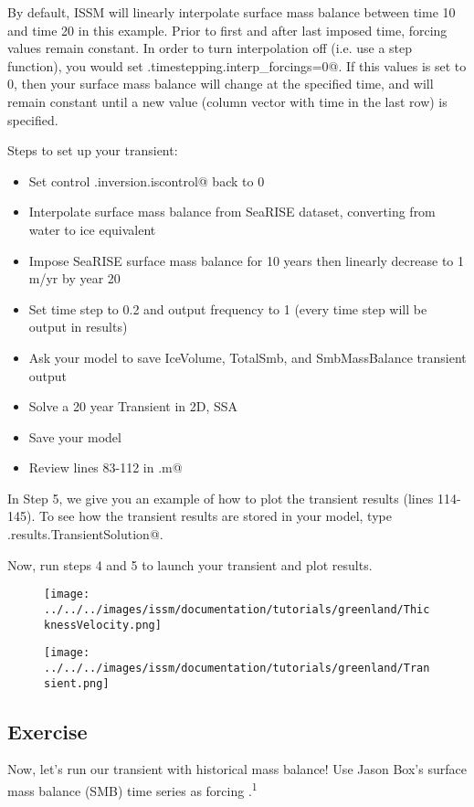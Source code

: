 By default, ISSM will linearly interpolate surface mass balance between time 10 and time 20 in this example. Prior to first and after last imposed time, forcing values remain constant. In order to turn interpolation off (i.e. use a step function), you would set \verb@md.timestepping.interp_forcings=0@. If this values is set to 0, then your surface mass balance will change at the specified time, and will remain constant until a new value (column vector with time in the last row) is specified.

Steps to set up your transient:
\begin{itemize}
	\item Set control \verb@md.inversion.iscontrol@ back to 0
	\item Interpolate surface mass balance from SeaRISE dataset, converting from water to ice equivalent
	\item Impose SeaRISE surface mass balance for 10 years then linearly decrease to 1 m/yr by year 20
	\item Set time step to 0.2 and output frequency to 1 (every time step will be output in results)
	\item Ask your model to save IceVolume, TotalSmb, and SmbMassBalance transient output
	\item Solve a 20 year Transient in 2D, SSA
	\item Save your model
	\item Review lines 83-112 in \verb@runme.m@
\end{itemize}

In Step 5, we give you an example of how to plot the transient results (lines 114-145). To see how the transient results are stored in your model, type \verb@md.results.TransientSolution@.

Now, run steps 4 and 5 to launch your transient and plot results.
\begin{figure}[H]
	\begin{center}
		\texttt{[image: ../../../images/issm/documentation/tutorials/greenland/ThicknessVelocity.png]}
	\end{center}
\end{figure}

\begin{figure}[H]
	\begin{center}
		\texttt{[image: ../../../images/issm/documentation/tutorials/greenland/Transient.png]}
	\end{center}
\end{figure}
\subsection{Exercise} %
Now, let's run our transient with historical mass balance! Use Jason Box's surface mass balance (SMB) time series as forcing \citep{Box2013a,Box2013b,Box2013c}.\textsuperscript{1}

